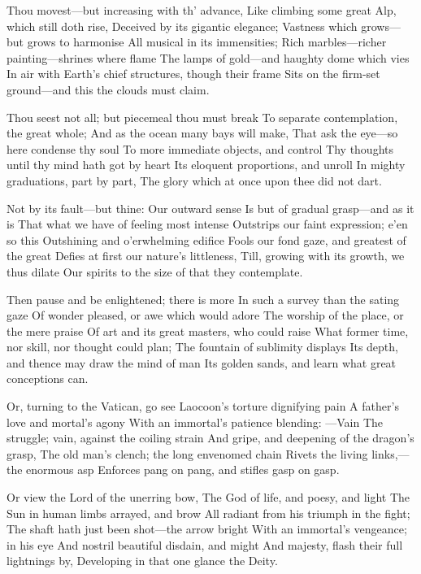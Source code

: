 \documentclass[10pt,twocolumn]{book}
\begin{document}
   Thou movest---but increasing with th' advance,
   Like climbing some great Alp, which still doth rise,
   Deceived by its gigantic elegance;
   Vastness which grows---but grows to harmonise\textemdash
   All musical in its immensities;
   Rich marbles---richer painting---shrines where flame
   The lamps of gold---and haughty dome which vies
   In air with Earth's chief structures, though their frame
Sits on the firm-set ground---and this the clouds must claim.


   Thou seest not all; but piecemeal thou must break
   To separate contemplation, the great whole;
   And as the ocean many bays will make,
   That ask the eye---so here condense thy soul
   To more immediate objects, and control
   Thy thoughts until thy mind hath got by heart
   Its eloquent proportions, and unroll
   In mighty graduations, part by part,
The glory which at once upon thee did not dart.


   Not by its fault---but thine:  Our outward sense
   Is but of gradual grasp---and as it is
   That what we have of feeling most intense
   Outstrips our faint expression; e'en so this
   Outshining and o'erwhelming edifice
   Fools our fond gaze, and greatest of the great
   Defies at first our nature's littleness,
   Till, growing with its growth, we thus dilate
Our spirits to the size of that they contemplate.


   Then pause and be enlightened; there is more
   In such a survey than the sating gaze
   Of wonder pleased, or awe which would adore
   The worship of the place, or the mere praise
   Of art and its great masters, who could raise
   What former time, nor skill, nor thought could plan;
   The fountain of sublimity displays
   Its depth, and thence may draw the mind of man
Its golden sands, and learn what great conceptions can.


   Or, turning to the Vatican, go see
   Laocoon's torture dignifying pain\textemdash
   A father's love and mortal's agony
   With an immortal's patience blending: ---Vain
   The struggle; vain, against the coiling strain
   And gripe, and deepening of the dragon's grasp,
   The old man's clench; the long envenomed chain
   Rivets the living links,---the enormous asp
Enforces pang on pang, and stifles gasp on gasp.


   Or view the Lord of the unerring bow,
   The God of life, and poesy, and light\textemdash
   The Sun in human limbs arrayed, and brow
   All radiant from his triumph in the fight;
   The shaft hath just been shot---the arrow bright
   With an immortal's vengeance; in his eye
   And nostril beautiful disdain, and might
   And majesty, flash their full lightnings by,
Developing in that one glance the Deity.
\end{document}

